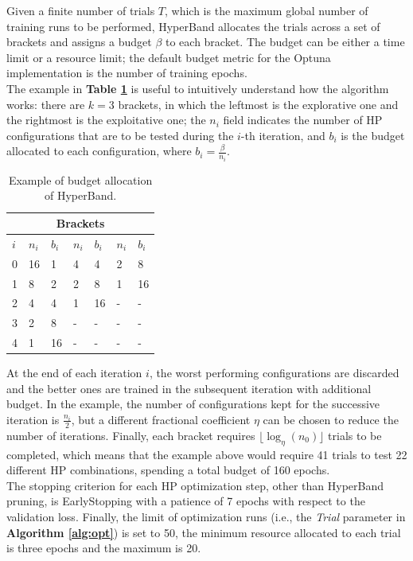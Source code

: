 Given a finite number of trials $T$, which is the maximum global number of training runs to be performed, HyperBand allocates the trials across a set of brackets and assigns a budget $\beta$ to each bracket. The budget can be either a time limit or a resource limit; the default budget metric for the Optuna implementation is the number of training epochs.\\
\noindent
The example in \textbf{Table \ref{tab:hyperBand}} is useful to intuitively understand how the algorithm works: there are $k = 3$ brackets, in which the leftmost is the explorative one and the rightmost is the exploitative one; the $n_i$ field indicates the number of HP configurations that are to be tested during the $i$-th iteration, and $b_i$ is the budget allocated to each configuration, where $b_i = \frac{\beta}{n_i}$.

\begin{table}[ht!]
\centering
    \begin{tabular}{ |p{.2cm}|p{1cm} p{.5cm}|p{1cm} p{.5cm}|p{1cm} p{.5cm}|  }
     \hline
     \multicolumn{7}{|c|}{Brackets} \\
     \hline
     $i$ & $n_i$ & $b_i$ & $n_i$ & $b_i$ &$n_i$ & $b_i$ \\
     \hline
     0 & 16 & 1 & 4 & 4 & 2 & 8 \\
     1 & 8  & 2 & 2 & 8 & 1 & 16\\
     2 & 4  & 4 & 1 & 16 & - & -\\
     3 & 2  & 8 & - & -  & - & -\\
     4 & 1  & 16& - & -  & - & -\\
     \hline
    \end{tabular}
    \caption{Example of budget allocation of HyperBand.} \label{tab:hyperBand}
\end{table}

\noindent
At the end of each iteration $i$, the worst performing configurations are discarded and the better ones are trained in the subsequent iteration with additional budget. In the example, the number of configurations kept for the successive iteration is $\frac{n_i}{2}$, but a different fractional coefficient $\eta$ can be chosen to reduce the number of iterations. Finally, each bracket requires $\lfloor\log_\eta(n_0)\rfloor$ trials to be completed, which means that the example above would require 41 trials to test 22 different HP combinations, spending a total budget of 160 epochs.\\

\noindent
The stopping criterion for each HP optimization step, other than HyperBand pruning, is EarlyStopping with a patience of 7 epochs with respect to the validation loss. Finally, the limit of optimization runs (i.e., the \textit{Trial} parameter in \textbf{Algorithm \ref{alg:opt}}) is set to 50, the minimum resource allocated to each trial is three epochs and the maximum is 20. \\

